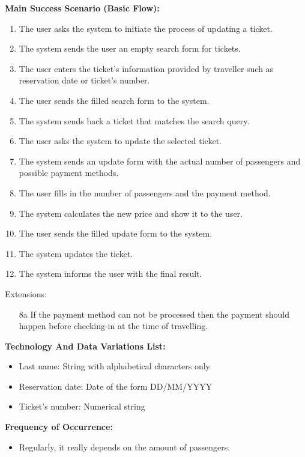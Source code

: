 \textbf{Main Success Scenario (Basic Flow):}
\begin{enumerate}
\item The user asks the system to initiate the process of updating a ticket.
\item The system sends the user an empty search form for tickets.
\item The user enters the ticket's information provided by traveller such as reservation date or ticket's number.
\item The user sends the filled search form to the system.
\item The system sends back a ticket that matches the search query.
\item The user asks the system to update the selected ticket.
\item The system sends an update form with the actual number of passengers and possible payment methods.
\item The user fills in the number of passengers and the payment method.
\item The system calculates the new price and show it to the user.
\item The user sends the filled update form to the system.
\item The system updates the ticket.
\item The system informs the user with the final result.
\end{enumerate}
Extensions:
\begin{enumerate}
\item[8a] If the payment method can not be processed then the payment should happen before checking-in at the time of travelling.
\end{enumerate}


\textbf{Technology And Data Variations List:} 
\begin{itemize}
    \item Last name: String with alphabetical characters only
    \item Reservation date: Date of the form DD/MM/YYYY
    \item Ticket's number: Numerical string
    \end{itemize}
\textbf{Frequency of Occurrence:} 
\begin{itemize}
    \item Regularly, it really depends on the amount of passengers.
\end{itemize} 

